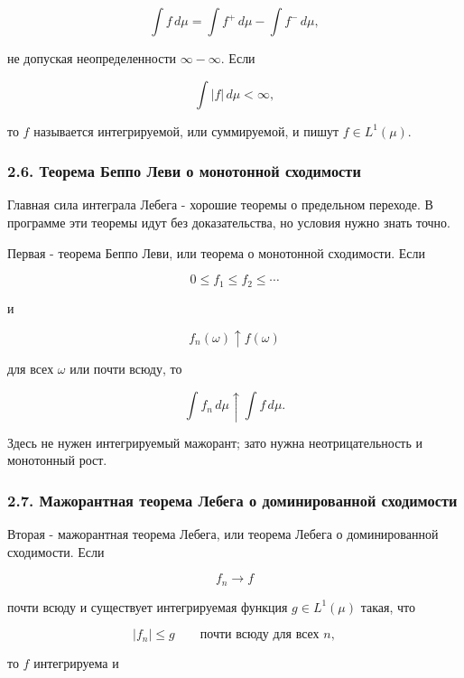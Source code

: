 \documentclass[
  11pt,
  a4paper,
]{article}
\begin{document}
\[
\int f\,d\mu=\int f^+\,d\mu-\int f^-\,d\mu,
\]

не допуская неопределенности \(\infty-\infty\). Если

\[
\int |f|\,d\mu<\infty,
\]

то \(f\) называется интегрируемой, или суммируемой, и пишут
\(f\in L^1(\mu)\).

\subsubsection{2.6. Теорема Беппо Леви о монотонной
сходимости}\label{ux442ux435ux43eux440ux435ux43cux430-ux431ux435ux43fux43fux43e-ux43bux435ux432ux438-ux43e-ux43cux43eux43dux43eux442ux43eux43dux43dux43eux439-ux441ux445ux43eux434ux438ux43cux43eux441ux442ux438}

Главная сила интеграла Лебега - хорошие теоремы о предельном переходе. В
программе эти теоремы идут без доказательства, но условия нужно знать
точно.

Первая - теорема Беппо Леви, или теорема о монотонной сходимости. Если

\[
0\le f_1\le f_2\le\cdots
\]

и

\[
f_n(\omega)\uparrow f(\omega)
\]

для всех \(\omega\) или почти всюду, то

\[
\int f_n\,d\mu\uparrow\int f\,d\mu.
\]

Здесь не нужен интегрируемый мажорант; зато нужна неотрицательность и
монотонный рост.

\subsubsection{2.7. Мажорантная теорема Лебега о доминированной
сходимости}\label{ux43cux430ux436ux43eux440ux430ux43dux442ux43dux430ux44f-ux442ux435ux43eux440ux435ux43cux430-ux43bux435ux431ux435ux433ux430-ux43e-ux434ux43eux43cux438ux43dux438ux440ux43eux432ux430ux43dux43dux43eux439-ux441ux445ux43eux434ux438ux43cux43eux441ux442ux438}

Вторая - мажорантная теорема Лебега, или теорема Лебега о доминированной
сходимости. Если

\[
f_n\to f
\]

почти всюду и существует интегрируемая функция \(g\in L^1(\mu)\) такая,
что

\[
|f_n|\le g
\qquad \text{почти всюду для всех }n,
\]

то \(f\) интегрируема и
\end{document}
